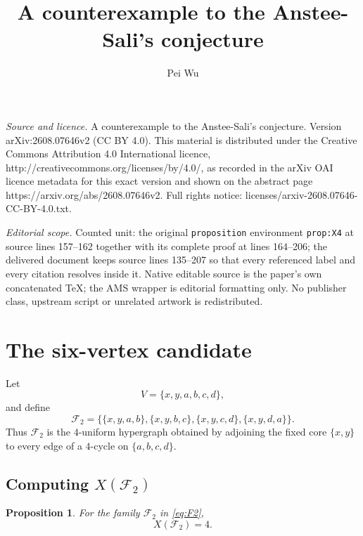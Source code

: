 \documentclass[10pt,a4paper]{amsart}
\newtheorem{proposition}[theorem]{Proposition}
\newcommand{\cF}{\mathcal F}
\begin{document}
\title[A counterexample to the Anstee-Sali's conjecture]{A counterexample to the Anstee-Sali's conjecture}
\author{Pei Wu}
\date{}
\maketitle
\noindent\emph{Source and licence.} A counterexample to the Anstee-Sali's conjecture. Version arXiv:2608.07646v2 (CC BY 4.0). This material is distributed under the Creative Commons Attribution 4.0 International licence, http://creativecommons.org/licenses/by/4.0/, as recorded in the arXiv OAI licence metadata for this exact version and shown on the abstract page https://arxiv.org/abs/2608.07646v2. Full rights notice: licenses/arxiv-2608.07646-CC-BY-4.0.txt.\par\smallskip
\noindent\textit{Editorial scope.} Counted unit: the original \texttt{proposition} environment \texttt{prop:X4} at source lines 157--162 together with its complete proof at lines 164--206; the delivered document keeps source lines 135--207 so that every referenced label and every citation resolves inside it. Native editable source is the paper's own concatenated TeX; the AMS wrapper is editorial formatting only. No publisher class, upstream script or unrelated artwork is redistributed.
	\section{The six-vertex candidate}
	
	Let
	\[
	V=\{x,y,a,b,c,d\},
	\]
	and define
	\begin{equation}\label{eq:F2}
		\cF_2
		=
		\bigl\{
		\{x,y,a,b\},
		\{x,y,b,c\},
		\{x,y,c,d\},
		\{x,y,d,a\}
		\bigr\}.
	\end{equation}
	Thus $\cF_2$ is the $4$-uniform hypergraph obtained by adjoining the fixed
	core $\{x,y\}$ to every edge of a $4$-cycle on $\{a,b,c,d\}$.
	
	\subsection{\texorpdfstring{Computing $X(\cF_2)$}{Computing X(F2)}}
	

	\begin{proposition}\label{prop:X4}
		For the family $\cF_2$ in \eqref{eq:F2},
		\[
		X(\cF_2)=4.
		\]
	\end{proposition}
\end{document}
